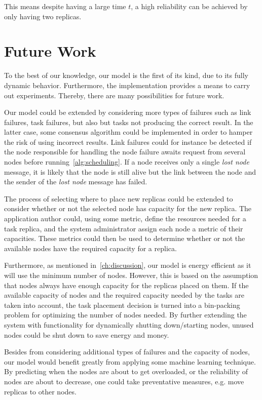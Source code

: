\documentclass{cslthse-msc}
\begin{document}
This means despite having a large time $t$, a high reliability can be achieved by only having two replicas. 



\chapter{Future Work} \label{ch:future_work}
To the best of our knowledge, our model is the first of its kind, due to its fully dynamic behavior. Furthermore, the implementation provides a means to carry out experiments. Thereby, there are many possibilities for future work. 

Our model could be extended by considering more types of failures such as link failures, task failures, but also but tasks not producing the correct result. In the latter case, some consensus algorithm could be implemented in order to hamper the risk of using incorrect results. Link failures could for instance be detected if the node responsible for handling the node failure awaits request from several nodes before running~\cref{alg:scheduling}. If a node receives only a single \emph{lost node} message, it is likely that the node is still alive but the link between the node and the sender of the \emph{lost node} message has failed.
 
The process of selecting where to place new replicas could be extended to consider whether or not the selected node has capacity for the new replica. The application author could, using some metric, define the resources needed for a task replica, and the system administrator assign each node a metric of their capacities. These metrics could then be used to determine whether or not the available nodes have the required capacity for a replica.

Furthermore, as mentioned in~\cref{ch:discussion}, our model is energy efficient as it will use the minimum number of nodes. However, this is based on the assumption that nodes always have enough capacity for the replicas placed on them. If the available capacity of nodes and the required capacity needed by the tasks are taken into account, the task placement decision is turned into a bin-packing problem for optimizing the number of nodes needed. By further extending the system with functionality for dynamically shutting down/starting nodes, unused nodes could be shut down to save energy and money.

Besides from considering additional types of failures and the capacity of nodes, our model would benefit greatly from applying some machine learning technique. By predicting when the nodes are about to get overloaded, or the reliability of nodes are about to decrease, one could take preventative measures, e.g. move replicas to other nodes.
\end{document}
